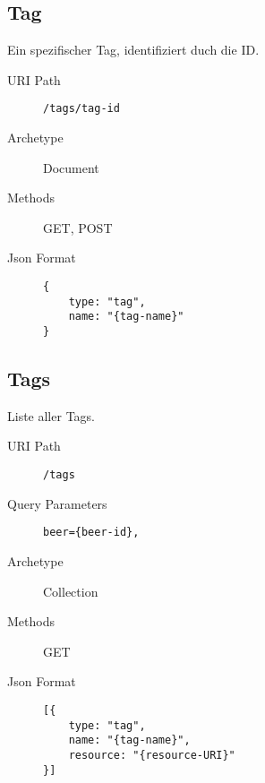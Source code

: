 \documentclass[10pt,a4paper]{scrartcl}
\begin{document}
\subsection{Tag}

Ein spezifischer Tag, identifiziert duch die ID.

\begin{description}
 	\item[URI Path] \texttt{/tags/{tag-id}}
	\item[Archetype] Document
	\item[Methods] GET, POST
	\item[Json Format] \hfill
\begin{lstlisting}
{	
	type: "tag",
	name: "{tag-name}"
}
\end{lstlisting}
\end{description}

\subsection{Tags}

Liste aller Tags.

\begin{description}
 	\item[URI Path] \texttt{/tags}
	\item[Query Parameters] \texttt{beer=\{beer-id\},}
	\item[Archetype] Collection
	\item[Methods] GET
	\item[Json Format] \hfill
\begin{lstlisting}
[{	
	type: "tag",
	name: "{tag-name}",
	resource: "{resource-URI}"
}]
\end{lstlisting}
\end{description}



\end{document}
